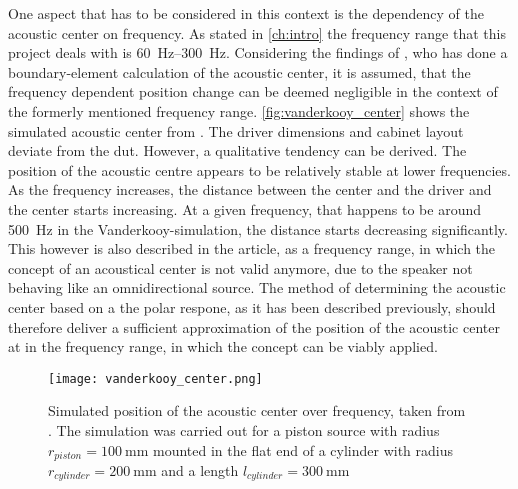 One aspect that has to be considered in this context is the dependency of the acoustic center on frequency. As stated in \autoref{ch:intro} the frequency range that this project deals with is \SIrange{60}{300}{\hertz}. Considering the findings of \citep{vanderkooy10}, who has done a boundary-element calculation of the acoustic center, it is assumed, that the frequency dependent position change can be deemed  negligible in the context of the formerly mentioned frequency range. 
\autoref{fig:vanderkooy_center} shows the simulated acoustic center from \citep{vanderkooy10}. The driver dimensions and cabinet layout deviate from the \gls{dut}. However, a qualitative tendency can be derived. The position of the acoustic centre appears to be relatively stable at lower frequencies. As the frequency increases, the distance between the center and the driver and the center starts increasing. At a given frequency, that happens to be around \SI{500}{\hertz} in the Vanderkooy-simulation, the distance starts decreasing significantly. This however is also described in the article, as a frequency range, in which the concept of an acoustical center is not valid anymore, due to the speaker not behaving like an omnidirectional source. The method of determining the acoustic center based on a the polar respone, as it has been described previously, should therefore deliver a sufficient approximation of the position of the acoustic center at in the frequency range, in which the concept can be viably applied.
\begin{figure}[htbp]
	\centering
	\texttt{[image: vanderkooy\_center.png]}
	\caption{Simulated position of the acoustic center over frequency, taken from \citep{vanderkooy10}. The simulation was carried out for a piston source with radius $r_{piston} = \SI{100}{\milli\meter}$ mounted in the flat end of a cylinder with radius $r_{cylinder} = \SI{200}{\milli\meter}$ and a length $l_{cylinder} = \SI{300}{\milli\meter}$}

		\label{fig:vanderkooy_center}
\end{figure}


